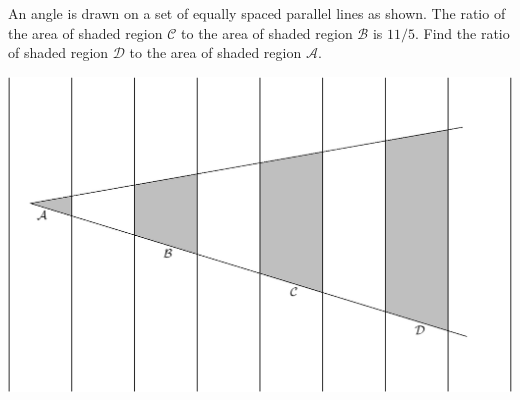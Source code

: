 An angle is drawn on a set of equally spaced parallel lines as shown.  The ratio of the area of shaded region $\mathcal{C}$ to the area of shaded region $\mathcal{B}$ is $11/5$.  Find the ratio of shaded region $\mathcal{D}$ to the area of shaded region $\mathcal{A}$.

\begin{center}
\includegraphics[width = 133.6mm]{img/fig0.png}
\end{center}